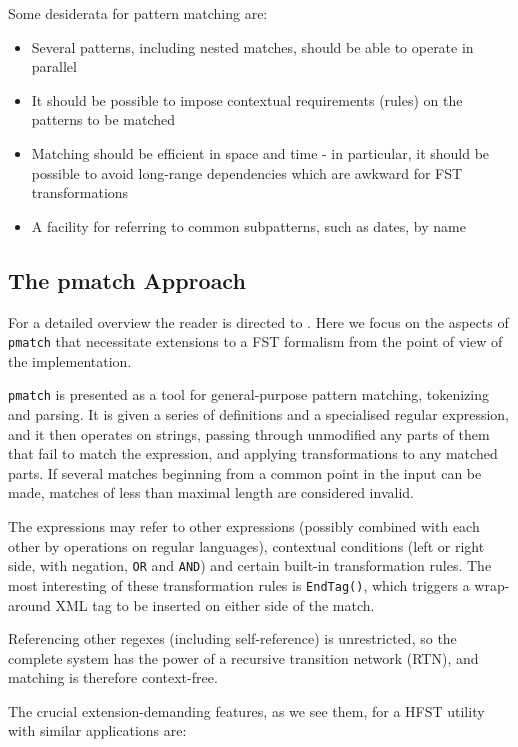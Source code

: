 \documentclass{llncs}
\begin{document}
Some desiderata for pattern matching are:

\begin{itemize}
\item Several patterns, including nested matches,
should be able to operate in parallel
\item It should be possible to impose contextual requirements (rules) on
the patterns to be matched
\item Matching should be efficient in space and time - in particular, it should
be possible to avoid long-range
dependencies which are awkward for FST transformations
\item A facility for referring to common subpatterns, such as dates, by name
\end{itemize}

\subsection{The pmatch Approach}

For a detailed overview the reader is directed to \cite{karttunen2011}.
Here we focus on the aspects of \verb!pmatch! that necessitate extensions
to a FST formalism from the point of view of the implementation.

\verb!pmatch! is presented as a tool for general-purpose pattern matching,
tokenizing and parsing. It is given a series of definitions and a
specialised regular expression, and it then operates on strings, passing
through unmodified any parts of them that fail to match the expression,
and applying transformations to any matched parts. If several matches beginning
from a common point in the input can be made, matches of less than maximal
length are considered invalid.

The expressions may refer to other expressions (possibly combined with each
other by operations on regular languages), contextual conditions
(left or right side, with negation, \verb!OR! and \verb!AND!) and certain
built-in transformation rules. The most interesting of these transformation
rules is \verb!EndTag()!, which triggers a wrap-around XML tag to be inserted
on either side of the match.

Referencing other regexes (including self-reference) is unrestricted, so
the complete system has the power of a recursive transition network (RTN),
and matching is therefore context-free.

The crucial extension-demanding features, as we see them, for a HFST utility
with similar applications are:
\end{document}
